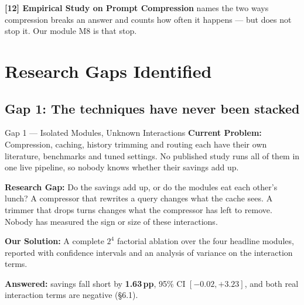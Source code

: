 \documentclass[11pt,a4paper]{article}
\newcommand{\lbl}[1]{\textcolor{accent}{\textbf{#1}}}
\begin{document}
\textbf{[12] Empirical Study on Prompt Compression} names the two ways compression
breaks an answer and counts how often it happens --- but does not stop it. Our
module M8 is that stop.

\section{Research Gaps Identified}

\subsection{Gap 1: The techniques have never been stacked}
\begin{gap}{Gap 1 --- Isolated Modules, Unknown Interactions}
\lbl{Current Problem:} Compression, caching, history trimming and routing each have
their own literature, benchmarks and tuned settings. No published study runs all of
them in one live pipeline, so nobody knows whether their savings add up.

\lbl{Research Gap:} Do the savings add up, or do the modules eat each other's lunch?
A compressor that rewrites a query changes what the cache sees. A trimmer that drops
turns changes what the compressor has left to remove. Nobody has measured the sign or
size of these interactions.

\lbl{Our Solution:} A complete $2^4$ factorial ablation over the four headline
modules, reported with confidence intervals and an analysis of variance on the
interaction terms.
\end{gap}
\textbf{Answered:} savings fall short by \textbf{1.63\,pp}, 95\% CI $[-0.02, +3.23]$,
and both real interaction terms are negative (\S6.1).
\end{document}
